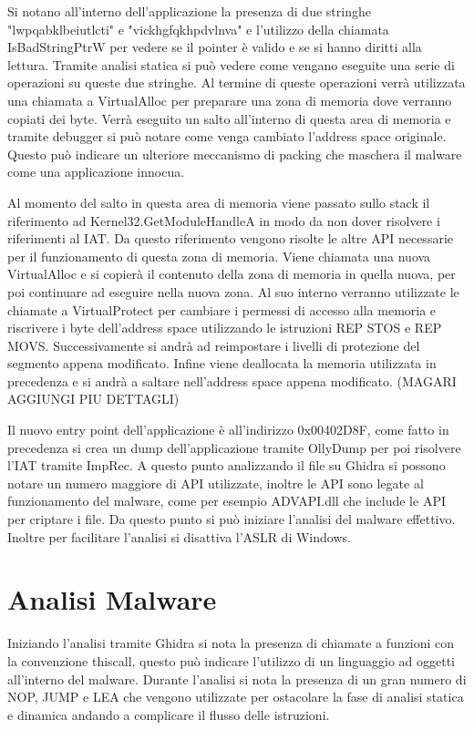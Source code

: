 \documentclass[]{article}
\begin{document}
Si notano all'interno dell'applicazione la presenza di due stringhe "lwpqabklbeiutlcti" e "vickhgfqkhpdvlnva" e l'utilizzo della chiamata IsBadStringPtrW per vedere se il pointer è valido e se si hanno diritti alla lettura. Tramite analisi statica si può vedere come vengano eseguite una serie di operazioni su queste due stringhe. Al termine di queste operazioni verrà utilizzata una chiamata a VirtualAlloc per preparare una zona di memoria dove verranno copiati dei byte.  Verrà eseguito un salto all'interno di questa area di memoria e tramite debugger si può notare come venga cambiato l'address space originale. Questo può indicare un ulteriore meccanismo di packing che maschera il malware come una applicazione innocua.

Al momento del salto in questa area di memoria viene passato sullo stack il riferimento ad Kernel32.GetModuleHandleA in modo da non dover risolvere i riferimenti al IAT. Da questo riferimento vengono risolte le altre API necessarie per il funzionamento di questa zona di memoria. Viene chiamata una nuova VirtualAlloc e si copierà il contenuto della zona di memoria in quella nuova, per poi continuare ad eseguire nella nuova zona. Al suo interno verranno utilizzate le chiamate a VirtualProtect per cambiare i permessi di accesso alla memoria e riscrivere i byte dell'address space utilizzando le istruzioni REP STOS e REP MOVS. Successivamente si andrà ad reimpostare i livelli di protezione del segmento appena modificato. Infine viene deallocata la memoria utilizzata in precedenza e si andrà a saltare nell'address space appena modificato.  (MAGARI AGGIUNGI PIU DETTAGLI)

Il nuovo entry point dell'applicazione è all'indirizzo 0x00402D8F, come fatto in precedenza si crea un dump dell'applicazione tramite OllyDump per poi risolvere l'IAT tramite ImpRec. A questo punto analizzando il file su Ghidra si possono notare un numero maggiore di API utilizzate, inoltre le API sono legate al funzionamento del malware, come per esempio ADVAPI.dll che include le API per criptare i file. Da questo punto si può iniziare l'analisi del malware effettivo. Inoltre per facilitare l'analisi si disattiva l'ASLR di Windows.

\section{Analisi Malware}
Iniziando l'analisi tramite Ghidra si nota la presenza di chiamate a funzioni con la convenzione thiscall, questo può indicare l'utilizzo di un linguaggio ad oggetti all'interno del malware. Durante l'analisi si nota la presenza di un gran numero di NOP, JUMP e LEA che vengono utilizzate per ostacolare la fase di analisi statica e dinamica andando a complicare il flusso delle istruzioni. 
\end{document}
